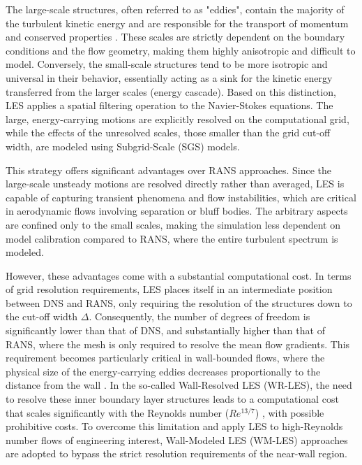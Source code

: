 \documentclass[12pt, a4paper, twoside, openright]{book}
\begin{document}
The large-scale structures, often referred to as "eddies", contain the majority of the turbulent kinetic energy and are responsible for the transport of momentum and conserved properties \cite{cfd-blazek}. These scales are strictly dependent on the boundary conditions and the flow geometry, making them highly anisotropic and difficult to model. Conversely, the small-scale structures tend to be more isotropic and universal in their behavior, essentially acting as a sink for the kinetic energy transferred from the larger scales (energy cascade). Based on this distinction, LES applies a spatial filtering operation to the Navier-Stokes equations. The large, energy-carrying motions are explicitly resolved on the computational grid, while the effects of the unresolved scales, those smaller than the grid cut-off width, are modeled using Subgrid-Scale (SGS) models.

This strategy offers significant advantages over RANS approaches. Since the large-scale unsteady motions are resolved directly rather than averaged, LES is capable of capturing transient phenomena and flow instabilities, which are critical in aerodynamic flows involving separation or bluff bodies. The arbitrary aspects are confined only to the small scales, making the simulation less dependent on model calibration compared to RANS, where the entire turbulent spectrum is modeled.

However, these advantages come with a substantial computational cost. In terms of grid resolution requirements, LES places itself in an intermediate position between DNS and RANS, only requiring the resolution of the structures down to the cut-off width $\Delta$. Consequently, the number of degrees of freedom is significantly lower than that of DNS, and substantially higher than that of RANS, where the mesh is only required to resolve the mean flow gradients. This requirement becomes particularly critical in wall-bounded flows, where the physical size of the energy-carrying eddies decreases proportionally to the distance from the wall \cite{turbulent-flows}. In the so-called Wall-Resolved LES (WR-LES), the need to resolve these inner boundary layer structures leads to a computational cost that scales significantly with the Reynolds number ($Re^{13/7}$) \cite{wrles-re-chapman} \cite{wrles-re-choi2012}, with possible prohibitive costs. To overcome this limitation and apply LES to high-Reynolds number flows of engineering interest, Wall-Modeled LES (WM-LES) approaches are adopted to bypass the strict resolution requirements of the near-wall region.
\end{document}
